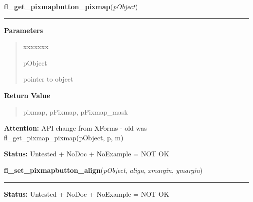     \label{xformslib:library:fl_get_pixmap_pixmap}

    \vspace{0.5ex}

\hspace{.8\funcindent}\begin{boxedminipage}{\funcwidth}

    \raggedright \textbf{fl\_get\_pixmapbutton\_pixmap}(\textit{pObject})

    \vspace{-1.5ex}

    \rule{\textwidth}{0.5\fboxrule}
\setlength{\parskip}{2ex}
\setlength{\parskip}{1ex}
      \textbf{Parameters}
      \vspace{-1ex}

      \begin{quote}
        \begin{Ventry}{xxxxxxx}

          \item[pObject]

          pointer to object

        \end{Ventry}

      \end{quote}

      \textbf{Return Value}
    \vspace{-1ex}

      \begin{quote}
      pixmap, pPixmap, pPixmap\_mask

      \end{quote}

\textbf{Attention:} API change from XForms - old was fl\_get\_pixmap\_pixmap(pObject, p, m)



\textbf{Status:} Untested + NoDoc + NoExample = NOT OK



    \end{boxedminipage}

    \label{xformslib:library:fl_set_pixmap_align}

    \vspace{0.5ex}

\hspace{.8\funcindent}\begin{boxedminipage}{\funcwidth}

    \raggedright \textbf{fl\_set\_pixmapbutton\_align}(\textit{pObject}, \textit{align}, \textit{xmargin}, \textit{ymargin})

    \vspace{-1.5ex}

    \rule{\textwidth}{0.5\fboxrule}
\setlength{\parskip}{2ex}
\setlength{\parskip}{1ex}
\textbf{Status:} Untested + NoDoc + NoExample = NOT OK



    \end{boxedminipage}


